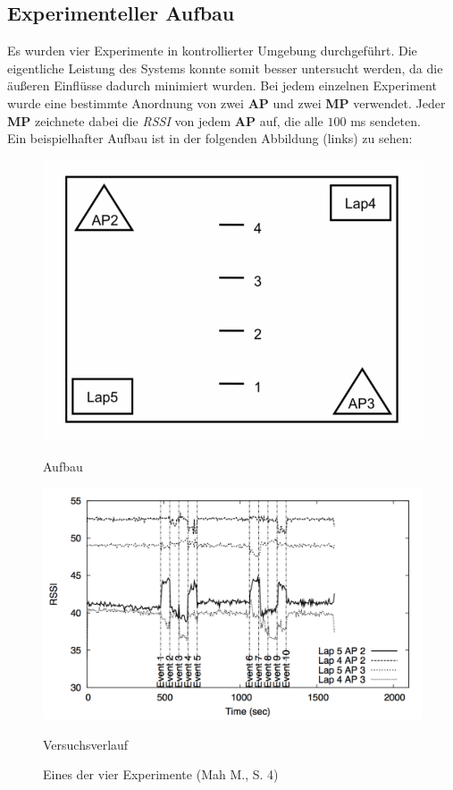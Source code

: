 \subsection{Experimenteller Aufbau}
Es wurden vier Experimente in kontrollierter Umgebung durchgeführt. Die eigentliche Leistung des Systems konnte somit besser untersucht werden, da die äußeren Einflüsse dadurch minimiert wurden. Bei jedem einzelnen Experiment wurde eine bestimmte Anordnung von zwei \textbf{AP} und zwei \textbf{MP} verwendet. Jeder \textbf{MP} zeichnete dabei die \textit{RSSI} von jedem \textbf{AP} auf, die alle $100$ ms sendeten.\\
Ein beispielhafter Aufbau ist in der folgenden Abbildung (links) zu sehen:

\begin{figure}[H]
\centering
\begin{minipage}{.5\textwidth}
  \centering
	\includegraphics[scale=0.6]{pictures/experiment}
	\caption*{Aufbau}
\end{minipage}%
\begin{minipage}{.5\textwidth}
  \centering
  \includegraphics[scale=0.45]{pictures/versuch}
  \caption*{Versuchsverlauf}
\end{minipage}
\caption{Eines der vier Experimente (Mah M., S. 4)}
\end{figure}


